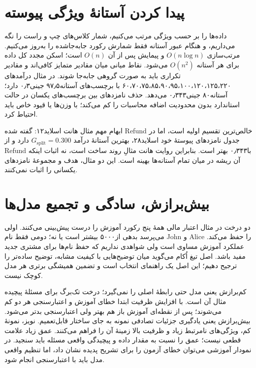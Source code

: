 \documentclass[12pt,a4paper,oneside]{report}
\begin{document}
\section{پیدا کردن آستانهٔ ویژگی پیوسته}

داده‌ها را بر حسب ویژگی مرتب می‌کنیم، شمار کلاس‌های چپ و راست را نگه می‌داریم، و هنگام عبور آستانه فقط شمارش رکورد جابه‌جا‌شده را به‌روز می‌کنیم. مرتب‌سازی $O(n\log n)$ و پیمایش پس از آن $O(n)$ است؛ اسکن مجدد کل داده برای هر آستانه $O(n^2)$ می‌شود. نقاط میانی میان مقادیر متمایز کافی‌اند و مقادیر تکراری باید به صورت گروهی جابه‌جا شوند. در مثال درآمدهای ۶۰،۷۰،۷۵،۸۵،۹۰،۹۵،۱۰۰،۱۲۰،۱۲۵،۲۲۰ با برچسب‌های  آستانه۹۷٫۵ جینی۰٫۳ دارد؛ آستانه۸۰ جینی۰٫۳۴۳ می‌دهد. حذف نامزدهای بین برچسب‌های یکسان در حالت استاندارد بدون محدودیت اضافه محاسبات را کم می‌کند؛ با وزن‌ها یا قیود خاص باید احتیاط کرد.

ابهام مهم مثال هانت اسلاید۱۲: گفته شده Refund خالص‌ترین تقسیم اولیه است، اما در جدول نامزدهای پیوستهٔ خود اسلاید۲۸، بهترین آستانهٔ درآمد $G_{\mathrm{split}}=0.300$ دارد و از Refund با۰٫۳۴۳ بهتر است. بنابراین روایت هانت مثالِ روند ساخت است، نه اثبات اینکه آن ریشه در میان تمام آستانه‌ها بهینه است. این دو مثال، هدف و مجموعهٔ نامزدهای یکسانی را اثبات نمی‌کنند.



\section{بیش‌برازش، سادگی و تجمیع مدل‌ها}

دو درخت در مثال اعتبار مالی همهٔ پنج رکورد آموزش را درست پیش‌بینی می‌کنند. اولی می‌پرسد بدهی از۵۰۰۰ بیشتر است یا نه؛ دومی فقط نام John و Alice را حفظ می‌کند. عملکرد آموزش مساوی است ولی شواهدی نداریم که حفظ نام‌ها برای مشتری جدید مفید باشد. اصل تیغ اُکام می‌گوید میان توضیح‌هایی با کیفیت مشابه، توضیح ساده‌تر را ترجیح دهیم؛ این اصل یک راهنمای انتخاب است و تضمین همیشگی برتری هر مدل کوچک نیست.

کم‌برازش یعنی مدل حتی رابطهٔ اصلی را نمی‌گیرد؛ درخت تک‌برگ برای مسئلهٔ پیچیده مثال آن است. با افزایش ظرفیت ابتدا خطای آموزش و اعتبارسنجی هر دو کم می‌شوند؛ پس از نقطه‌ای آموزش باز هم بهتر ولی اعتبارسنجی بدتر می‌شود. بیش‌برازش یعنی یادگیری جزئیات تصادفی نمونه به جای ساختار قابل‌تعمیم. نویز، نمونهٔ کم، ویژگی‌های نامرتبط زیاد و ظرفیت بالا زمینهٔ آن را فراهم می‌کنند. عمق زیاد علامت قطعی نیست؛ عمق را نسبت به مقدار داده و پیچیدگی واقعی مسئله باید سنجید. در نمودار آموزشی می‌توان خطای آزمون را برای تشریح پدیده نشان داد، اما تنظیم واقعی مدل باید با اعتبارسنجی انجام شود.
\end{document}
